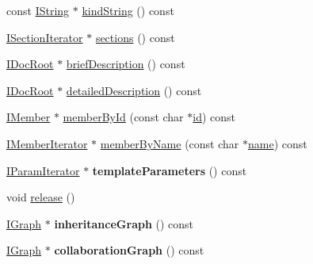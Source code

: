 \begin{DoxyCompactItemize}
\item 
const \mbox{\hyperlink{class_i_string}{I\+String}} $\ast$ \mbox{\hyperlink{class_compound_handler_a8564086585b4054a14ae9548dabed0ca}{kind\+String}} () const
\item 
\mbox{\hyperlink{class_i_section_iterator}{I\+Section\+Iterator}} $\ast$ \mbox{\hyperlink{class_compound_handler_ac692ed207cfa36644d6844e77d6d4fc2}{sections}} () const
\item 
\mbox{\hyperlink{class_i_doc_root}{I\+Doc\+Root}} $\ast$ \mbox{\hyperlink{class_compound_handler_a082a2132828d9949c5889a7d5a225b01}{brief\+Description}} () const
\item 
\mbox{\hyperlink{class_i_doc_root}{I\+Doc\+Root}} $\ast$ \mbox{\hyperlink{class_compound_handler_a59b5dcb1da507d212bfc09323832a7b5}{detailed\+Description}} () const
\item 
\mbox{\hyperlink{class_i_member}{I\+Member}} $\ast$ \mbox{\hyperlink{class_compound_handler_ac73126f245d618162a90bc2f6906c548}{member\+By\+Id}} (const char $\ast$\mbox{\hyperlink{class_compound_handler_ae9331f707437a480334f55471922ae13}{id}}) const
\item 
\mbox{\hyperlink{class_i_member_iterator}{I\+Member\+Iterator}} $\ast$ \mbox{\hyperlink{class_compound_handler_afc374b0797b025ba660c558ca1d73137}{member\+By\+Name}} (const char $\ast$\mbox{\hyperlink{class_compound_handler_ac7c192318d397bf053bb3ee44903aca7}{name}}) const
\item 
\mbox{\label{class_compound_handler_ad0ecb89bb7b096e81edf5d3e91e8c9a3}} 
\mbox{\hyperlink{class_i_param_iterator}{I\+Param\+Iterator}} $\ast$ {\bfseries template\+Parameters} () const
\item 
void \mbox{\hyperlink{class_compound_handler_a29f352627cbc021762c72835dfb63778}{release}} ()
\item 
\mbox{\label{class_compound_handler_a004a4547ff01f898e0076e4d444a72a5}} 
\mbox{\hyperlink{class_i_graph}{I\+Graph}} $\ast$ {\bfseries inheritance\+Graph} () const
\item 
\mbox{\label{class_compound_handler_ac37596fe6a9209749718c3f9ffab4057}} 
\mbox{\hyperlink{class_i_graph}{I\+Graph}} $\ast$ {\bfseries collaboration\+Graph} () const
\item 
\mbox{\label{class_compound_handler_af77f4b28cd4fe5b3249f093eb7428d8e}} 

\end{DoxyCompactItemize}
